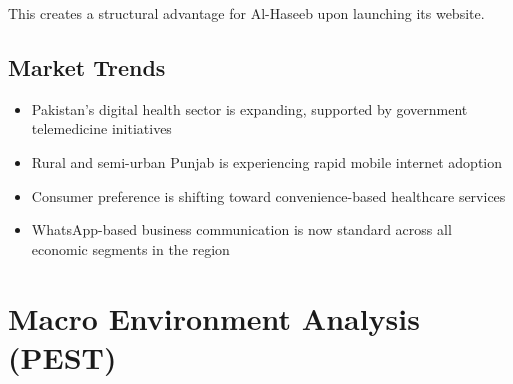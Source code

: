 \documentclass[12pt, a4paper]{article}
\begin{document}
This creates a structural advantage for Al-Haseeb upon launching its website.

\subsection{Market Trends}

\begin{itemize}[leftmargin=1.4em]
    \item Pakistan's digital health sector is expanding, supported by government telemedicine initiatives
    \item Rural and semi-urban Punjab is experiencing rapid mobile internet adoption
    \item Consumer preference is shifting toward convenience-based healthcare services
    \item WhatsApp-based business communication is now standard across all economic segments in the region
\end{itemize}

\newpage

\section{Macro Environment Analysis (PEST)}
\end{document}
